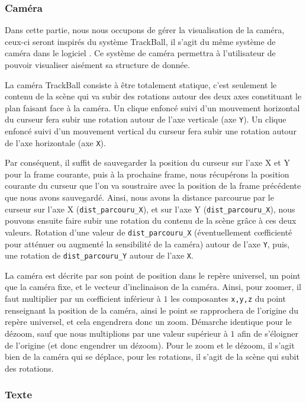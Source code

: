 \documentclass[a4paper, 11pt]{article}
\begin{document}
\subsubsection{Caméra}

Dans cette partie, nous nous occupons de gérer la visualisation de la caméra, ceux-ci seront inspirés du système TrackBall, il s'agit du même système de caméra dans le logiciel . Ce système de caméra permettra à l'utilisateur de pouvoir visualiser aisément sa structure de donnée.

La caméra TrackBall consiste à être totalement statique, c'est seulement le contenu de la scène qui va subir des rotations autour des deux axes constituant le plan faisant face à la caméra. Un clique enfoncé suivi d'un mouvement horizontal du curseur fera subir une rotation autour de l'axe verticale (axe \texttt{Y}). Un clique enfoncé suivi d'un mouvement vertical du curseur fera subir une rotation autour de l'axe horizontale (axe \texttt{X}).

Par conséquent, il suffit de sauvegarder la position du curseur sur l'axe X et Y pour la frame courante, puis à la prochaine frame, nous récupérons la position courante du curseur que l'on va soustraire avec la position de la frame précédente que nous avons sauvegardé. Ainsi, nous avons la distance parcourue par le curseur sur l'axe X (\texttt{dist\_parcouru\_X}), et sur l'axe Y (\texttt{dist\_parcouru\_X}), nous pouvons ensuite faire subir une rotation du contenu de la scène grâce à ces deux valeurs. Rotation d'une valeur de \texttt{dist\_parcouru\_X} (éventuellement cœfficienté pour atténuer ou augmenté la sensibilité de la caméra) autour de l'axe \texttt{Y}, puis, une rotation de \texttt{dist\_parcouru\_Y} autour de l'axe \texttt{X}.

La caméra est décrite par son point de position dans le repère universel, un point que la caméra fixe, et le vecteur d'inclinaison de la caméra. Ainsi, pour zoomer, il faut multiplier par un cœfficient inférieur à $1$ les composantes \texttt{x,y,z} du point renseignant la position de la caméra, ainsi le point se rapprochera de l'origine du repère universel, et cela engendrera donc un zoom. Démarche identique pour le dézoom, sauf que nous multiplions par une valeur supérieur à $1$ afin de s'éloigner de l'origine (et donc engendrer un dézoom). Pour le zoom et le dézoom, il s'agit bien de la caméra qui se déplace, pour les rotations, il s'agit de la scène qui subit des rotations.

\subsubsection{Texte}
\end{document}
